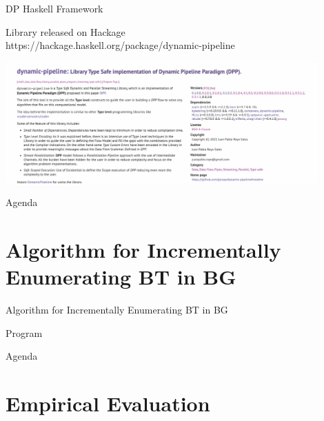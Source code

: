 \documentclass{beamer}
\begin{document}
  \begin{frame}[fragile]{DP Haskell Framework}
    \begin{block}{}
      Library released on Hackage \\
      https://hackage.haskell.org/package/dynamic-pipeline
      \begin{center}
        \includegraphics[width = 0.9\textwidth, height = 0.6\textheight]{dp-fw-hs}
      \end{center}  
    \end{block}
  \end{frame}

  \begin{frame}{Agenda}
    \section{Algorithm for Incrementally Enumerating BT in BG}
    \tableofcontents[currentsection]
  \end{frame}

  \begin{frame}[fragile]{Algorithm for Incrementally Enumerating BT in BG}
    \begin{block}{Program}
    \end{block}
  \end{frame}


  \begin{frame}{Agenda}
    \section{Empirical Evaluation}
    \tableofcontents[currentsection]
  \end{frame}
\end{document}
